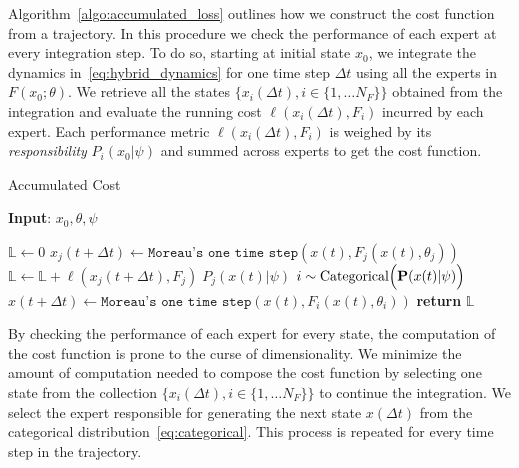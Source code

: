 \begin{enumerate}
    Algorithm~\eqref{algo:accumulated_loss} outlines how we construct the
    cost function from a trajectory.
    In this procedure we check the performance of each expert at every
    integration step.
    To do so, starting at initial state $x_0$, we integrate the dynamics
    in~\eqref{eq:hybrid_dynamics} for one time step $\Delta t$ using all the
    experts in $F(x_0;\theta)$.
    We retrieve all the states $\{ x_i(\Delta t) , i \in \{1, \dots N_F \}\}$
    obtained from the integration and evaluate the running cost $\ell(x_i(\Delta
    t), F_i)$ incurred by each expert.
    Each performance metric $\ell(x_i(\Delta t), F_i)$ is weighed by its
    \textit{responsibility} $P_i(x_0 | \psi)$ and summed across experts to get
    the cost function.
    \begin{algorithm}[tb]
        \caption{Accumulated Cost}
        \label{algo:accumulated_loss}
        \small
        \hspace*{\algorithmicindent} \textbf{Input}: $x_0, \theta, \psi$
        \begin{algorithmic}[1]
            \State $\mathbb{L} \leftarrow 0$
                    \State $x_j(t+\Delta t) \leftarrow \texttt{Moreau's one time step}(x(t), F_j(x(t), \theta_j))$
                    \State $\mathbb{L} \leftarrow \mathbb{L} + \ell(x_j(t+\Delta t), F_j) \; P_j(x(t) | \psi)$
                \EndFor
                \State $i \sim \text{Categorical}\Bigl(\mathbf{P}(x(t)| \psi)\Bigr)$ 
                \State $x(t + \Delta t) \leftarrow \texttt{Moreau's one time step}(x(t), F_i(x(t), \theta_i))$
                \EndFor
            \State \textbf{return} $\mathbb{L}$
        \end{algorithmic}
    \end{algorithm}
    By checking the performance of each expert for every state, the computation
    of the cost function is prone to the curse of dimensionality.
    We minimize the amount of computation needed to compose the cost function by
    selecting one state from the collection $\{ x_i(\Delta t) , i \in \{1,
    \dots N_F \}\}$ to continue the integration.
    We select the expert responsible for generating the next state $x(\Delta t)$
    from the categorical distribution~\eqref{eq:categorical}.
    This process is repeated for every time step in the trajectory.


\end{enumerate}
